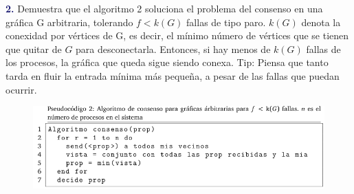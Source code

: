 \newpage
\textbf{\textcolor{MidnightBlue}{2.}} Demuestra que el algoritmo 2 soluciona el problema del consenso en una gráfica G arbitraria, tolerando $f < k(G)$ fallas de tipo paro. $k(G)$ denota la conexidad por vértices de G, es decir, el mínimo número de vértices que se tienen que quitar de $G$ para desconectarla. Entonces, si hay menos de $k(G)$ fallas de los procesos, la gráfica que queda sigue siendo conexa. Tip: Piensa que tanto tarda en fluir la entrada mínima más pequeña, a pesar de las fallas que puedan ocurrir.

\begin{figure}
  \includegraphics[width=\textwidth]{consensoProblema2.png}
\end{figure}


